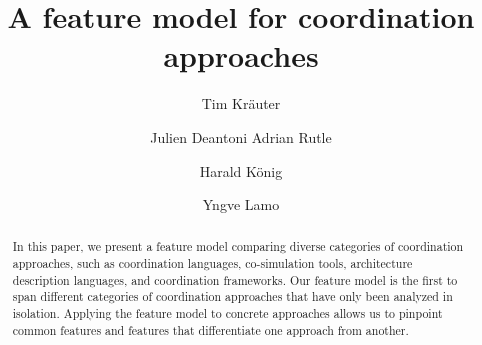 \documentclass[runningheads]{llncs}
\begin{document}
\title{A feature model for coordination approaches}
%
%
\author{Tim Kr\"{a}uter \and
Julien Deantoni
Adrian Rutle \and
Harald K\"{o}nig \and
Yngve Lamo}
%
%
\maketitle

\begin{abstract}
In this paper, we present a feature model comparing diverse categories of coordination approaches, such as coordination languages, co-simulation tools, architecture description languages, and coordination frameworks.
Our feature model is the first to span different categories of coordination approaches that have only been analyzed in isolation.
Applying the feature model to concrete approaches allows us to pinpoint common features and features that differentiate one approach from another.
\end{abstract}

\end{document}
